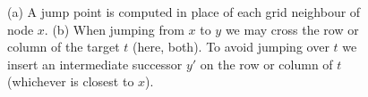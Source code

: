 \begin{figure}[tb]
       \label{fig:preproc}
       \begin{center}
         \scalebox{.8}{}
       \end{center}
       \caption{\small (a) A jump point is computed in place of each grid neighbour of node $x$.
		(b) When jumping from $x$ to $y$ we may cross the row or column of the target $t$ (here, both). 
To avoid jumping over $t$ we insert an intermediate successor $y'$ on the row or column of $t$ (whichever is closest to $x$).}
\end{figure}
